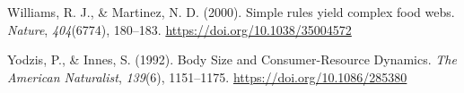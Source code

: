 \documentclass[
]{article}
\newlength{\cslhangindent}
\newenvironment{CSLReferences}[2] %
 {\begin{list}{}{%
  \setlength{\itemindent}{0pt}
  \setlength{\leftmargin}{0pt}
  \setlength{\parsep}{0pt}
  \ifodd #1
   \setlength{\leftmargin}{\cslhangindent}
   \setlength{\itemindent}{-1\cslhangindent}
  \fi
  \setlength{\itemsep}{#2\baselineskip}}}
 {\end{list}}
\begin{document}
\begin{CSLReferences}{1}{0}
Williams, R. J., \& Martinez, N. D. (2000). Simple rules yield complex
food webs. \emph{Nature}, \emph{404}(6774), 180--183.
\url{https://doi.org/10.1038/35004572}

Yodzis, P., \& Innes, S. (1992). Body {Size} and {Consumer-Resource
Dynamics}. \emph{The American Naturalist}, \emph{139}(6), 1151--1175.
\url{https://doi.org/10.1086/285380}

\end{CSLReferences}
\end{document}
